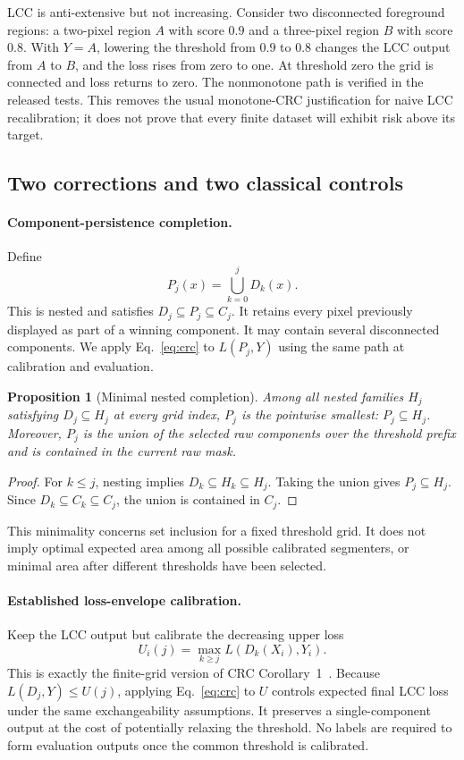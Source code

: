 \documentclass[11pt,a4paper]{article}
\newtheorem{proposition}{Proposition}
\begin{document}
LCC is anti-extensive but not increasing. Consider two disconnected foreground regions: a two-pixel region $A$ with score $0.9$ and a three-pixel region $B$ with score $0.8$. With $Y=A$, lowering the threshold from $0.9$ to $0.8$ changes the LCC output from $A$ to $B$, and the loss rises from zero to one. At threshold zero the grid is connected and loss returns to zero. The nonmonotone path is verified in the released tests. This removes the usual monotone-CRC justification for naive LCC recalibration; it does not prove that every finite dataset will exhibit risk above its target.

\subsection{Two corrections and two classical controls}
\paragraph{Component-persistence completion.}
Define
\begin{equation}
 P_j(x)=\bigcup_{k=0}^{j}D_k(x).
 \label{eq:prefix}
\end{equation}
This is nested and satisfies $D_j\subseteq P_j\subseteq C_j$. It retains every pixel previously displayed as part of a winning component. It may contain several disconnected components. We apply Eq.~\eqref{eq:crc} to $L(P_j,Y)$ using the same path at calibration and evaluation.

\begin{proposition}[Minimal nested completion]
Among all nested families $H_j$ satisfying $D_j\subseteq H_j$ at every grid index, $P_j$ is the pointwise smallest: $P_j\subseteq H_j$. Moreover, $P_j$ is the union of the selected raw components over the threshold prefix and is contained in the current raw mask.
\end{proposition}
\begin{proof}
For $k\le j$, nesting implies $D_k\subseteq H_k\subseteq H_j$. Taking the union gives $P_j\subseteq H_j$. Since $D_k\subseteq C_k\subseteq C_j$, the union is contained in $C_j$.
\end{proof}
This minimality concerns set inclusion for a fixed threshold grid. It does not imply optimal expected area among all possible calibrated segmenters, or minimal area after different thresholds have been selected.

\paragraph{Established loss-envelope calibration.}
Keep the LCC output but calibrate the decreasing upper loss
\begin{equation}
 U_i(j)=\max_{k\ge j}L(D_k(X_i),Y_i).
 \label{eq:envelope}
\end{equation}
This is exactly the finite-grid version of CRC Corollary~1~\cite{crc}. Because $L(D_j,Y)\le U(j)$, applying Eq.~\eqref{eq:crc} to $U$ controls expected final LCC loss under the same exchangeability assumptions. It preserves a single-component output at the cost of potentially relaxing the threshold. No labels are required to form evaluation outputs once the common threshold is calibrated.
\end{document}
